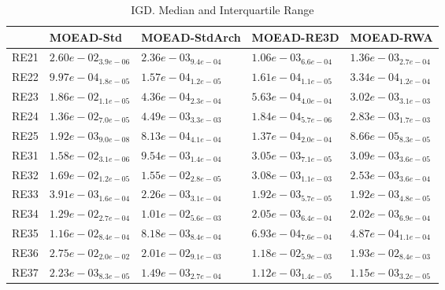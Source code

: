 \documentclass{article}
\begin{document}
\begin{table}
\caption{IGD. Median and Interquartile Range}
\label{table: IGD}
\centering
\begin{scriptsize}
\begin{tabular}{lllll}
\hline & MOEAD-Std & MOEAD-StdArch & MOEAD-RE3D &  MOEAD-RWA\\
\hline 
RE21 & $  2.60e-02_{ 3.9e-06}$ & $  2.36e-03_{ 9.4e-04}$ & \cellcolor{gray95}$  1.06e-03_{ 6.6e-04}$ & \cellcolor{gray25}$  1.36e-03_{ 2.7e-04}$ \\
RE22 & $  9.97e-04_{ 1.8e-05}$ & \cellcolor{gray95}$  1.57e-04_{ 1.2e-05}$ & \cellcolor{gray25}$  1.61e-04_{ 1.1e-05}$ & $  3.34e-04_{ 1.2e-04}$ \\
RE23 & $  1.86e-02_{ 1.1e-05}$ & \cellcolor{gray95}$  4.36e-04_{ 2.3e-04}$ & \cellcolor{gray25}$  5.63e-04_{ 4.0e-04}$ & $  3.02e-03_{ 3.1e-03}$ \\
RE24 & $  1.36e-02_{ 7.0e-05}$ & $  4.49e-03_{ 3.3e-03}$ & \cellcolor{gray95}$  1.84e-04_{ 5.7e-06}$ & \cellcolor{gray25}$  2.83e-03_{ 1.7e-03}$ \\
RE25 & $  1.92e-03_{ 9.0e-08}$ & $  8.13e-04_{ 4.1e-04}$ & \cellcolor{gray25}$  1.37e-04_{ 2.0e-04}$ & \cellcolor{gray95}$  8.66e-05_{ 8.3e-05}$ \\
RE31 & $  1.58e-02_{ 3.1e-06}$ & $  9.54e-03_{ 1.4e-04}$ & \cellcolor{gray95}$  3.05e-03_{ 7.1e-05}$ & \cellcolor{gray25}$  3.09e-03_{ 3.6e-05}$ \\
RE32 & $  1.69e-02_{ 1.2e-05}$ & $  1.55e-02_{ 2.8e-05}$ & \cellcolor{gray25}$  3.08e-03_{ 1.1e-03}$ & \cellcolor{gray95}$  2.53e-03_{ 3.6e-04}$ \\
RE33 & $  3.91e-03_{ 1.6e-04}$ & $  2.26e-03_{ 3.1e-04}$ & \cellcolor{gray25}$  1.92e-03_{ 5.7e-05}$ & \cellcolor{gray95}$  1.92e-03_{ 4.8e-05}$ \\
RE34 & $  1.29e-02_{ 2.7e-04}$ & $  1.01e-02_{ 5.6e-03}$ & \cellcolor{gray25}$  2.05e-03_{ 6.4e-04}$ & \cellcolor{gray95}$  2.02e-03_{ 6.9e-04}$ \\
RE35 & $  1.16e-02_{ 8.4e-04}$ & $  8.18e-03_{ 8.4e-04}$ & \cellcolor{gray25}$  6.93e-04_{ 7.6e-04}$ & \cellcolor{gray95}$  4.87e-04_{ 1.1e-04}$ \\
RE36 & $  2.75e-02_{ 2.0e-02}$ & $  2.01e-02_{ 9.1e-03}$ & \cellcolor{gray95}$  1.18e-02_{ 5.9e-03}$ & \cellcolor{gray25}$  1.93e-02_{ 8.4e-03}$ \\
RE37 & $  2.23e-03_{ 8.3e-05}$ & $  1.49e-03_{ 2.7e-04}$ & \cellcolor{gray95}$  1.12e-03_{ 1.4e-05}$ & \cellcolor{gray25}$  1.15e-03_{ 3.2e-05}$ \\

\end{tabular}
\end{scriptsize}
\end{table}
\end{document}
